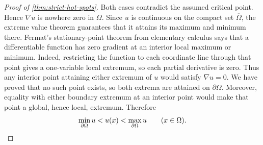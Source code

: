 \begin{proof}[Proof of \cref{thm:strict-hot-spots}]
Both cases contradict the assumed critical point. Hence $\nabla u$
is nowhere zero in $\Omega$.
Since $u$ is continuous on the compact set $\overline\Omega$, the
extreme value theorem guarantees that it attains its maximum and
minimum there. Fermat's stationary-point theorem from elementary calculus
says that a differentiable function has zero gradient at an interior
local maximum or minimum. Indeed, restricting the function to each
coordinate line through that point gives a one-variable local extremum,
so each partial derivative is zero. Thus any interior point attaining
either extremum of $u$ would satisfy $\nabla u=0$. We have proved that no
such point exists, so both extrema are attained on $\partial\Omega$.
Moreover, equality with either boundary extremum at an interior
point would make that point a global, hence local, extremum.
Therefore
\[
 \min_{\partial\Omega}u<u(x)<\max_{\partial\Omega}u
 \qquad(x\in\Omega).\qedhere
\]
\end{proof}
